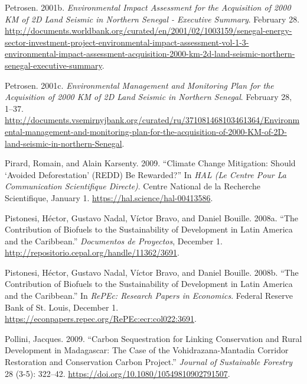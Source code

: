 \begin{CSLReferences}{1}{1}
Petrosen. 2001b. \emph{Environmental Impact Assessment for the
Acquisition of 2000 KM of 2D Land Seismic in Northern Senegal -
Executive Summary}. February 28.
\url{http://documents.worldbank.org/curated/en/2001/02/1003159/senegal-energy-sector-investment-project-environmental-impact-assessment-vol-1-3-environmental-impact-assessment-acquisition-2000-km-2d-land-seismic-northern-senegal-executive-summary}.

Petrosen. 2001c. \emph{Environmental Management and Monitoring Plan for
the Acquisition of 2000 KM of 2D Land Seismic in Northern Senegal}.
February 28, 1--37.
\url{http://documents.vsemirnyjbank.org/curated/ru/371081468103461364/Environmental-management-and-monitoring-plan-for-the-acquisition-of-2000-KM-of-2D-land-seismic-in-northern-Senegal}.

Pirard, Romain, and Alain Karsenty. 2009. {``Climate Change Mitigation:
Should {`Avoided Deforestation'} (REDD) Be Rewarded?''} In \emph{HAL (Le
Centre Pour La Communication Scientifique Directe)}. Centre National de
la Recherche Scientifique, January 1.
\url{https://hal.science/hal-00413586}.

Pistonesi, Héctor, Gustavo Nadal, Víctor Bravo, and Daniel Bouille.
2008a. {``The Contribution of Biofuels to the Sustainability of
Development in Latin America and the Caribbean.''} \emph{Documentos de
Proyectos}, December 1.
\url{http://repositorio.cepal.org/handle/11362/3691}.

Pistonesi, Héctor, Gustavo Nadal, Víctor Bravo, and Daniel Bouille.
2008b. {``The Contribution of Biofuels to the Sustainability of
Development in Latin America and the Caribbean.''} In \emph{RePEc:
Research Papers in Economics}. Federal Reserve Bank of St. Louis,
December 1. \url{https://econpapers.repec.org/RePEc:ecr:col022:3691}.

Pollini, Jacques. 2009. {``Carbon Sequestration for Linking Conservation
and Rural Development in Madagascar: The Case of the
Vohidrazana-Mantadia Corridor Restoration and Conservation Carbon
Project.''} \emph{Journal of Sustainable Forestry} 28 (3-5): 322--42.
\url{https://doi.org/10.1080/10549810902791507}.


\end{CSLReferences}
